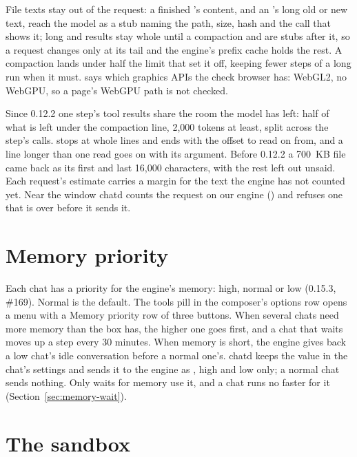 File texts stay out of the request: a finished 's content, and an 's long old or new text, reach the model as a stub naming the path, size, hash and the  call that shows it; long  and  results stay whole until a compaction and are stubs after it, so a request changes only at its tail and the engine's prefix cache holds the rest. A compaction lands under half the limit that set it off, keeping fewer steps of a long run when it must.  says which graphics APIs the check browser has: WebGL2, no WebGPU, so a page's WebGPU path is not checked.

Since 0.12.2 one step's tool results share the room the model has left: half of what is left under the compaction line, 2{,}000 tokens at least, split across the step's calls.  stops at whole lines and ends with the offset to read on from, and a line longer than one read goes on with its  argument. Before 0.12.2 a 700~KB file came back as its first and last 16{,}000 characters, with the rest left out unsaid. Each request's estimate carries a margin for the text the engine has not counted yet. Near the window chatd counts the request on our engine () and refuses one that is over before it sends it.

\section{Memory priority}\label{sec:chat-priority}

Each chat has a priority for the engine's memory: high, normal or low (0.15.3, \#169). Normal is the default. The tools pill in the composer's options row opens a menu with a Memory priority row of three buttons. When several chats need more memory than the box has, the higher one goes first, and a chat that waits moves up a step every 30 minutes. When memory is short, the engine gives back a low chat's idle conversation before a normal one's. chatd keeps the value in the chat's settings and sends it to the engine as , high and low only; a normal chat sends nothing. Only waits for memory use it, and a chat runs no faster for it (Section~\ref{sec:memory-wait}).

\section{The sandbox}\label{sec:chat-sandbox}

